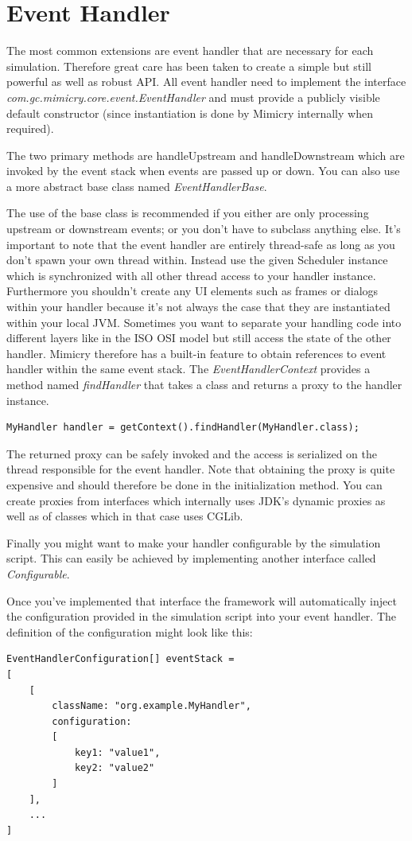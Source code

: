 \documentclass[a4paper,oneside]{book}
\begin{document}
\section{Event Handler}
The most common extensions are event handler that are necessary for each simulation. Therefore great care has been taken to create a simple but still powerful as well as robust API.
All event handler need to implement the interface \textit{com.gc.mimicry.core.event.EventHandler} and must provide a publicly visible default constructor (since instantiation is done by Mimicry internally when required).

The two primary methods are handleUpstream and handleDownstream which are invoked by the event stack when events are passed up or down. You can also use a more abstract base class named \textit{EventHandlerBase}.

The use of the base class is recommended if you either are only processing upstream or downstream events; or you don't have to subclass anything else.
It's important to note that the event handler are entirely thread-safe as long as you don't spawn your own thread within. Instead use the given Scheduler instance which is synchronized with all other thread access to your handler instance. Furthermore you shouldn't create any UI elements such as frames or dialogs within your handler because it's not always the case that they are instantiated within your local JVM.
Sometimes you want to separate your handling code into different layers like in the ISO OSI model but still access the state of the other handler. Mimicry therefore has a built-in feature to obtain references to event handler within the same event stack. The \textit{EventHandlerContext} provides a method named \textit{findHandler} that takes a class and returns a proxy to the handler instance.
\begin{lstlisting}
MyHandler handler = getContext().findHandler(MyHandler.class);
\end{lstlisting}
The returned proxy can be safely invoked and the access is serialized on the thread responsible for the event handler. Note that obtaining the proxy is quite expensive and should therefore be done in the initialization method.
You can create proxies from interfaces which internally uses JDK's dynamic proxies as well as of classes which in that case uses CGLib.

Finally you might want to make your handler configurable by the simulation script. This can easily be achieved by implementing another interface called \textit{Configurable}.

Once you've implemented that interface the framework will automatically inject the configuration provided in the simulation script into your event handler. The definition of the configuration might look like this:
\begin{lstlisting}
EventHandlerConfiguration[] eventStack = 
[
	[
		className: "org.example.MyHandler",
		configuration: 
		[
			key1: "value1",
			key2: "value2"
		]
	],
	...
]
\end{lstlisting}
\end{document}
